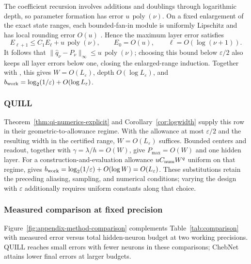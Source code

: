 The coefficient recursion involves additions and doublings through logarithmic
depth, so parameter formation has error $u\,\operatorname{poly}(\nu)$.
On a fixed enlargement of the exact state ranges, each bounded-fan-in module
is uniformly Lipschitz and has local rounding error $O(u)$
\cite[Chs.~2--3]{Higham2002}. Hence the maximum layer error satisfies
\[
 E_{\ell+1}\le C_1E_\ell+u\,\operatorname{poly}(\nu),
 \qquad E_0=O(u),\qquad \ell=O(\log(\nu+1)).
\]
It follows that $\|\widehat q_\nu-P_\nu\|_\infty\le
u\,\operatorname{poly}(\nu)$; choosing this bound below $\varepsilon/2$
also keeps all layer errors below one, closing the enlarged-range induction.
Together with , this gives $W=O(L_\varepsilon)$,
depth $O(\log L_\varepsilon)$, and
$b_{\rm work}=\log_2(1/\varepsilon)+O(\log L_\varepsilon)$.

\subsubsection{QUILL}
Theorem~\ref{thm:qi-numerics-explicit} and Corollary~\ref{cor:logwidth}
supply this row in their geometric-to-allowance regime. With the allowance
at most $\varepsilon/2$ and the resulting width in the certified range,
$W=O(L_\varepsilon)$ suffices. Bounded centers and readout, together with
$\gamma=\lambda/h=O(W)$, give $P_{\max}=O(W)$ and one hidden layer.
For a construction-and-evaluation allowance $uC_{\rm num}W^q$ uniform on
that regime,  gives
$b_{\rm work}=\log_2(1/\varepsilon)+O(\log W)=O(L_\varepsilon)$.
These substitutions retain the preceding aliasing, sampling, and numerical
conditions; varying the design with $\varepsilon$ additionally requires
uniform constants along that choice.

\subsubsection{Measured comparison at fixed precision}
\label{app:measured-method-comparison}

Figure~\ref{fig:appendix-method-comparison} complements
Table~\ref{tab:comparison} with measured error versus total
hidden-neuron budget at two working precisions. QUILL reaches small errors with fewer neurons in these comparisons;
ChebNet attains lower final errors at larger budgets.

